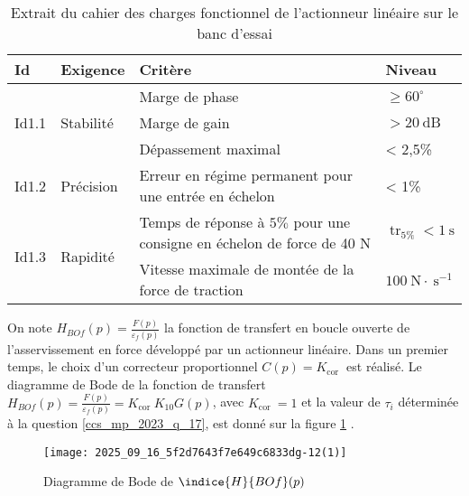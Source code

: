 \begin{table}[h]
\begin{center}
\begin{tabular}{|l|l|l|l|}
\hline
Id & Exigence & Critère & Niveau \\
\hline
\multirow[t]{3}{*}{Id1.1} & \multirow[t]{3}{*}{Stabilité} & Marge de phase & $\geqslant 60^{\circ}$ \\
\hline
 &  & Marge de gain & $>20 \mathrm{~dB}$ \\
\hline
 &  & Dépassement maximal & < 2,5\% \\
\hline
Id1.2 & Précision & Erreur en régime permanent pour une entrée en échelon & < 1\% \\
\hline
\multirow[t]{2}{*}{Id1.3} & \multirow[t]{2}{*}{Rapidité} & Temps de réponse à $5 \%$ pour une consigne en échelon de force de 40 N & $\operatorname{tr}_{5 \%}<1 \mathrm{~s}$ \\
\hline
 &  & Vitesse maximale de montée de la force de traction & $100 \mathrm{~N} \cdot \mathrm{~s}^{-1}$ \\
\hline
\end{tabular}
\caption{\label{ccs_mp_2023_tab_05}Extrait du cahier des charges fonctionnel de l'actionneur linéaire sur le banc d'essai}
\end{center}
\end{table}

On note $H_{B O f}(p)=\frac{F(p)}{\varepsilon_{f}(p)}$ la fonction de transfert en boucle ouverte de l'asservissement en force développé par un actionneur linéaire. Dans un premier temps, le choix d'un correcteur proportionnel $C(p)=K_{\text {cor }}$ est réalisé. Le diagramme de Bode de la fonction de transfert $H_{B O f}(p)=\frac{F(p)}{\varepsilon_{f}(p)}=K_{\text {cor }} K_{10} G(p)$, avec $K_{\text {cor }}=1$ et la valeur de $\tau_{i}$ déterminée à la question \ref{ccs_mp_2023_q_17}, est donné sur la figure \ref{ccs_mp_2023_fig_16} .



\begin{figure}[!h]
\centering
\texttt{[image: 2025\_09\_16\_5f2d7643f7e649c6833dg-12(1)]}
\caption{\label{ccs_mp_2023_fig_16}  Diagramme de Bode de $\indice{H}{BO f}(p)$}
\end{figure}



